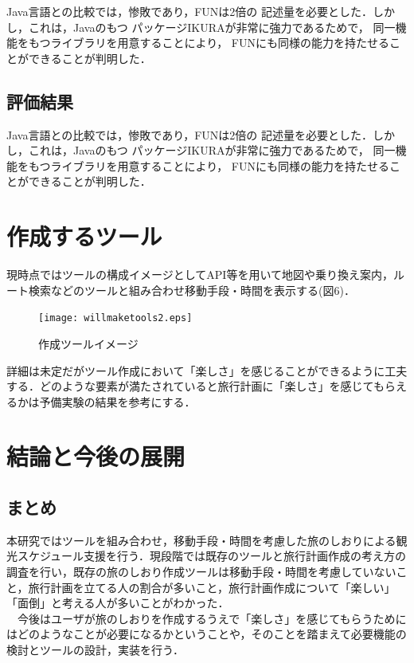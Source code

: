 \documentclass{funthesis}
\begin{document}
Java言語との比較では，惨敗であり，FUNは2倍の
記述量を必要とした．しかし，これは，Javaのもつ
パッケージIKURAが非常に強力であるためで，
同一機能をもつライブラリを用意することにより，
FUNにも同様の能力を持たせることができることが判明した．

\section{評価結果}

Java言語との比較では，惨敗であり，FUNは2倍の
記述量を必要とした．しかし，これは，Javaのもつ
パッケージIKURAが非常に強力であるためで，
同一機能をもつライブラリを用意することにより，
FUNにも同様の能力を持たせることができることが判明した．

\chapter{作成するツール}%

現時点ではツールの構成イメージとしてAPI等を用いて地図や乗り換え案内，ルート検索などのツールと組み合わせ移動手段・時間を表示する(図6)．
\begin{figure}[htpb]
\begin{center}
\texttt{[image: willmaketools2.eps]}
\caption{作成ツールイメージ}
\end{center}
\end{figure}

詳細は未定だがツール作成において「楽しさ」を感じることができるように工夫する．どのような要素が満たされていると旅行計画に「楽しさ」を感じてもらえるかは予備実験の結果を参考にする．\\

\chapter{結論と今後の展開}%

\section{まとめ}

本研究ではツールを組み合わせ，移動手段・時間を考慮した旅のしおりによる観光スケジュール支援を行う．現段階では既存のツールと旅行計画作成の考え方の調査を行い，既存の旅のしおり作成ツールは移動手段・時間を考慮していないこと，旅行計画を立てる人の割合が多いこと，旅行計画作成について「楽しい」「面倒」と考える人が多いことがわかった．\\
　今後はユーザが旅のしおりを作成するうえで「楽しさ」を感じてもらうためにはどのようなことが必要になるかということや，そのことを踏まえて必要機能の検討とツールの設計，実装を行う．
\end{document}
